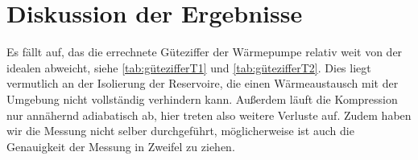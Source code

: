 \documentclass{scrartcl} %
\begin{document}
    \section{Diskussion der Ergebnisse}
      \label{sec:Auswertung}
      Es fällt auf, das die errechnete Güteziffer der Wärmepumpe relativ weit von der idealen abweicht, siehe \ref{tab:gütezifferT1} und \ref{tab:gütezifferT2}. Dies liegt vermutlich
      an der Isolierung der
      Reservoire, die einen Wärmeaustausch mit der Umgebung nicht vollständig verhindern kann. Außerdem läuft die Kompression nur annähernd adiabatisch ab, hier treten also weitere
      Verluste auf. Zudem haben wir die Messung nicht selber durchgeführt, möglicherweise ist auch die Genauigkeit der Messung in Zweifel zu ziehen.
\nocite{*}
\printbibliography
\end{document}
